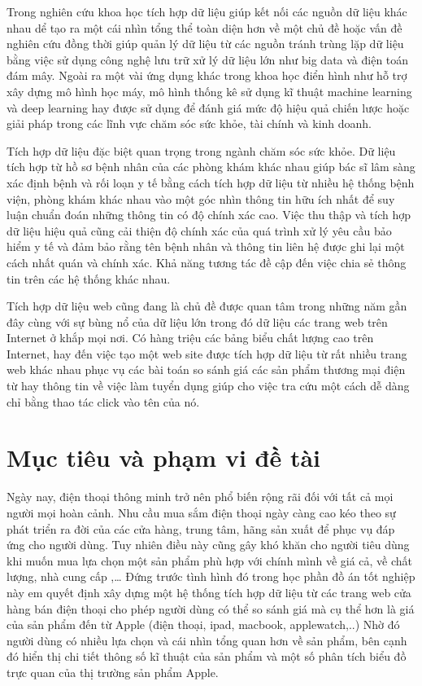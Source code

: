\documentclass[../DoAn.tex]{subfiles}
\begin{document}
Trong nghiên cứu khoa học tích hợp dữ liệu giúp kết nối các nguồn dữ liệu khác nhau dể tạo ra một cái nhìn tổng thể toàn diện hơn về một chủ đề hoặc vấn đề nghiên cứu đồng thời giúp quản lý dữ liệu từ các nguồn tránh trùng lặp dữ liệu bằng việc sử dụng công nghệ lưu trữ xử lý dữ liệu lớn như big data và điện toán đám mây. Ngoài ra một vài ứng dụng khác trong khoa học điển hình như hỗ trợ xây dựng mô hình học máy, mô hình thống kê sử dụng kĩ thuật machine learning và deep learning hay được sử dụng để đánh giá mức độ hiệu quả chiến lược hoặc giải pháp  trong các lĩnh vực chăm sóc sức khỏe, tài chính và kinh doanh.

Tích hợp dữ liệu đặc biệt quan trọng trong ngành chăm sóc sức khỏe. Dữ liệu tích hợp từ hồ sơ bệnh nhân của các phòng khám khác nhau giúp bác sĩ lâm sàng xác định bệnh và rối loạn y tế bằng cách tích hợp dữ liệu từ nhiều hệ thống bệnh viện, phòng khám khác nhau vào một góc nhìn thông tin hữu ích nhất để suy luận chuẩn đoán những thông tin có độ chính xác cao. Việc thu thập và tích hợp dữ liệu hiệu quả cũng cải thiện độ chính xác của quá trình xử lý yêu cầu bảo hiểm y tế và đảm bảo rằng tên bệnh nhân và thông tin liên hệ được ghi lại một cách nhất quán và chính xác. Khả năng tương tác đề cập đến việc chia sẻ thông tin trên các hệ thống khác nhau.

Tích hợp dữ liệu web cũng đang là chủ đề được quan tâm trong những năm gần đây cùng với sự bùng nổ của dữ liệu lớn trong đó dữ liệu các trang web trên Internet ở khắp mọi nơi. Có hàng triệu các bảng biểu chất lượng cao trên Internet, hay đến việc tạo một web site được tích hợp dữ liệu từ rất nhiều trang web khác nhau phục vụ các bài toán so sánh giá các sản phẩm thương mại điện từ hay thông tin về việc làm tuyển dụng giúp cho việc tra cứu một cách dễ dàng chỉ bằng thao tác click vào tên của nó.

\section{Mục tiêu và phạm vi đề tài}
\label{section:1.2}
Ngày nay, điện thoại thông minh trở nên phổ biến rộng rãi đối với tất cả mọi người mọi hoàn cảnh. Nhu cầu mua sắm điện thoại ngày càng cao kéo theo sự phát triển ra đời của các cửa hàng, trung tâm, hãng sản xuất để phục vụ đáp ứng cho người dùng. Tuy nhiên điều này cũng gây khó khăn cho người tiêu dùng khi muốn mua lựa chọn một sản phẩm phù hợp với chính mình về giá cả, về chất lượng, nhà cung cấp ,… Đứng trước tình hình đó trong học phần đồ án tốt nghiệp này em quyết định xây dựng một hệ thống tích hợp dữ liệu từ các trang web cửa hàng bán điện thoại cho phép người dùng có thể so sánh giá mà cụ thể hơn là giá của sản phẩm đến từ Apple (điện thoại, ipad, macbook, applewatch,..) Nhờ đó người dùng có nhiều lựa chọn và cái nhìn tổng quan hơn về sản phẩm, bên cạnh đó hiển thị chi tiết thông số kĩ thuật của sản phẩm và một số phân tích biểu đồ trực quan của thị trường sản phẩm Apple.
\end{document}
